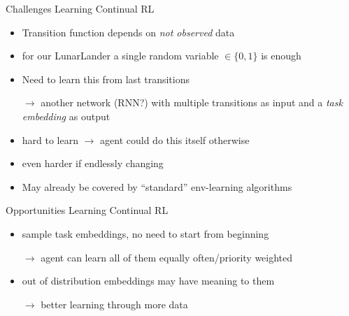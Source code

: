 \documentclass[12pt]{beamer}
\begin{document}
\begin{frame}{Challenges Learning Continual RL}
  \begin{itemize}
    \item Transition function depends on \textit{not observed} data
    \item for our LunarLander a single random variable $\in \{0, 1\}$ is enough
    \item Need to learn this from last transitions
    \pause
  \item[$\rightarrow$] another network (RNN?) with multiple transitions as input and a \textit{task embedding} as output
    \item hard to learn $\rightarrow$ agent could do this itself otherwise
    \item even harder if endlessly changing
    \item May already be covered by \enquote{standard} env-learning algorithms
  \end{itemize}
\end{frame}

\begin{frame}{Opportunities Learning Continual RL}
  \begin{itemize}
    \item sample task embeddings, no need to start from beginning
    \item[$\rightarrow$] agent can learn all of them equally often/priority weighted
    \pause
    \item out of distribution embeddings may have meaning to them
    \item[$\rightarrow$] better learning through more data
  \end{itemize}
\end{frame}
\end{document}
